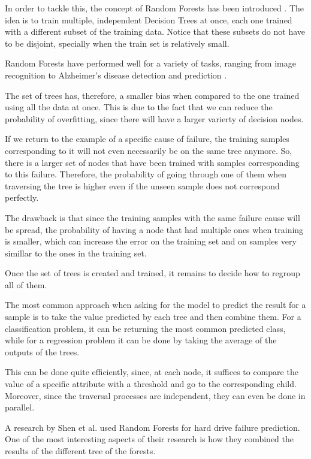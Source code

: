 In order to tackle this, the concept of Random Forests has been introduced \cite{ho1995random}.
The idea is to train multiple, independent Decision Trees at once, each one trained with a different subset of the training data.
Notice that these subsets do not have to be disjoint, specially when the train set is relatively small.

Random Forests have performed well for a variety of tasks, ranging from image recognition to Alzheimer's disease detection and prediction \cite{shaik2019brief}.

The set of trees has, therefore, a smaller bias when compared to the one trained using all the data at once.
This is due to the fact that we can reduce the probability of overfitting, since there will have a larger varierty of decision nodes.

If we return to the example of a specific cause of failure, the training samples corresponding to it will not even necessarily be on the same tree anymore.
So, there is a larger set of nodes that have been trained with samples corresponding to this failure.
Therefore, the probability of going through one of them when traversing the tree is higher even if the unseen sample does not correspond perfectly.

The drawback is that since the training samples with the same failure cause will be spread, the probability of having a node that had multiple ones when training is smaller, which can increase the error on the training set and on samples very simillar to the ones in the training set.

Once the set of trees is created and trained, it remains to decide how to regroup all of them.

The most common approach when asking for the model to predict the result for a sample is to take the value predicted by each tree and then combine them.
For a classification problem, it can be returning the most common predicted class, while for a regression problem it can be done by taking the average of the outputs of the trees.

This can be done quite efficiently, since, at each node, it suffices to compare the value of a specific attribute with a threshold and go to the corresponding child.
Moreover, since the traversal processes are independent, they can even be done in parallel.

A research by Shen et al. \cite{Shen18} used Random Forests for hard drive failure prediction.
One of the most interesting aspects of their research is how they combined the results of the different tree of the forests.

